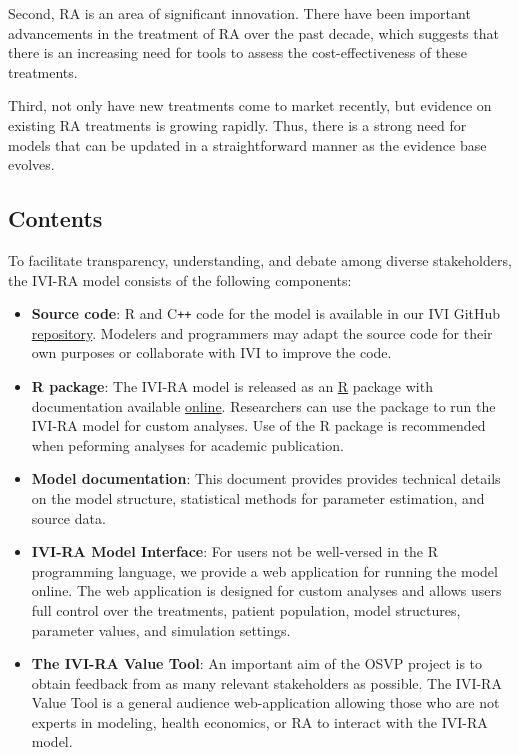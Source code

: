 \documentclass[11pt,final,fleqn]{article}\usepackage[]{graphicx}\usepackage[]{color}
\theoremstyle{plain}
\newcommand\CPP{{C\texttt{++}}}
\newcommand\R{{\textsf{R}}}
\begin{document}
Second, RA is an area of significant innovation. There have been important advancements in the treatment of RA over the past decade, which suggests that there is an increasing need for tools to assess the cost-effectiveness of these treatments.

Third, not only have new treatments come to market recently, but evidence on existing RA treatments is growing rapidly. Thus, there is a strong need for models that can be updated in a straightforward manner as the evidence base evolves.

\subsection{Contents}\label{sec:contents}
To facilitate transparency, understanding, and debate among diverse stakeholders, the IVI-RA model consists of the following components:

\begin{itemize}
\item \textbf{Source code}: {\R{}} and \CPP{} code for the model is available in our IVI GitHub \href{https://github.com/InnovationValueInitiative/IVI-RA}{repository}. Modelers and programmers may adapt the source code for their own purposes or collaborate with IVI to improve the code.  
\item \textbf{{\R{}} package}: The IVI-RA model is released as an \href{https://cran.r-project.org/}{\R{}} package with documentation available \href{https://innovationvalueinitiative.github.io/IVI-RA/index.html}{online}. Researchers can use the package to run the IVI-RA model for custom analyses. Use of the {\R{}} package is recommended when peforming analyses for academic publication.
\item \textbf{Model documentation}: This document provides provides technical details on the model structure, statistical methods for parameter estimation, and source data.
\item \textbf{IVI-RA Model Interface}: For users not be well-versed in the {\R{}} programming language, we provide a web application for running the model online. The web application is designed for custom analyses and allows users full control over the treatments, patient population, model structures, parameter values, and simulation settings.  
\item \textbf{The IVI-RA Value Tool}: An important aim of the OSVP project is to obtain feedback from as many relevant stakeholders as possible. The IVI-RA Value Tool is a general audience web-application allowing those who are not experts in modeling, health economics, or RA to interact with the IVI-RA model. 
\end{itemize}
\end{document}
